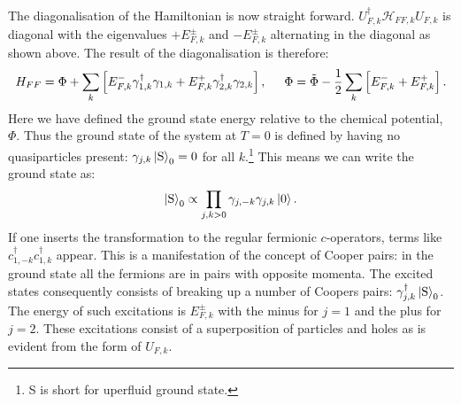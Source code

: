The diagonalisation of the Hamiltonian is now straight forward. $U^\dagger_{F,k}\mathcal{H}_{FF,k}U_{F,k}$ is diagonal with the eigenvalues $+E^{\pm}_{F,k}$ and $-E^{\pm}_{F,k}$ alternating in the diagonal as shown above. The result of the diagonalisation is therefore:
\begin{align}
H_{FF} = \Phi + \sum_{k} \left[ E^{-}_{F,k}\gamma^\dagger_{1, k}\gamma_{1, k} + E^{+}_{F,k}\gamma^\dagger_{2, k}\gamma_{2, k} \right], \hspace{0.5cm} \Phi = \tilde{\Phi} - \frac{1}{2}\sum_k \left[ E^{-}_{F,k} + E^{+}_{F,k} \right]. 
\label{eq.2wiresDiagonalisedHamiltonian}
\end{align}  
Here we have defined the ground state energy relative to the chemical potential, $\Phi$. Thus the ground state of the system at $T = 0$ is defined by having no quasiparticles present: $\gamma_{j,k} \ket{\text{S}}_0 = 0$ for all $k$.\footnote{S is short for uperfluid ground state.} This means we can write the ground state as:
\begin{equation}
\ket{\text{S}}_0 \propto \prod_{j,k > 0} \gamma_{j,-k}\gamma_{j,k}\ket{0}.
\label{eq.superfluidgroundstate}
\end{equation}
If one inserts the transformation to the regular fermionic $c$-operators, terms like $c^\dagger_{1,-k}c^\dagger_{1,k}$ appear. This is a manifestation of the concept of Cooper pairs: in the ground state all the fermions are in pairs with opposite momenta. The excited states consequently consists of breaking up a number of Coopers pairs: $\gamma^\dagger_{j,k}\ket{\text{S}}_0$. The energy of such excitations is $E^{\pm}_{F,k}$ with the minus for $j = 1$ and the plus for $j = 2$. These excitations consist of a superposition of particles and holes as is evident from the form of $U_{F,k}$. 

